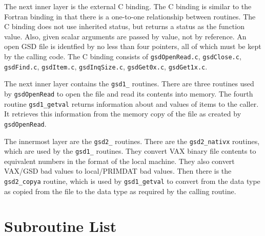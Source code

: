 \documentclass[oneside,11pt]{starlink}
\begin{document}
The next inner layer is the external C binding. The C binding is similar to
the Fortran binding in that there is a one-to-one relationship between
routines. The C binding does not use inherited status, but returns a status as
the function value. Also, given scalar arguments are passed by value, not by
reference. An open GSD file is identfied by no less than four pointers, all of
which must be kept by the calling code.  The C binding consists of
\texttt{gsdOpenRead.c}, \texttt{gsdClose.c}, \texttt{gsdFind.c},
\texttt{gsdItem.c}, \texttt{gsdInqSize.c}, \texttt{gsdGet0x.c},
\texttt{gsdGet1x.c}.

The next inner layer contains the \texttt{gsd1\_} routines. There are three
routines used by \texttt{gsdOpenRead} to open the file and read its contents
into memory.  The fourth routine \texttt{gsd1\_getval} returns information
about and values of items to the caller. It retrieves this information from
the memory copy of the file as created by \texttt{gsdOpenRead}.

The innermost layer are the \texttt{gsd2\_} routines. There are the
\texttt{gsd2\_nativx} routines, which are used by the \texttt{gsd1\_}
routines. They convert VAX binary file contents to equivalent numbers in the
format of the local machine.  They also convert VAX/GSD bad values to
local/PRIMDAT bad values\cite{primdat}. Then there is the \texttt{gsd2\_copya}
routine, which is used by \texttt{gsd1\_getval} to convert from the data type
as copied from the file to the data type as required by the calling routine.

\section{Subroutine List}
\end{document}
